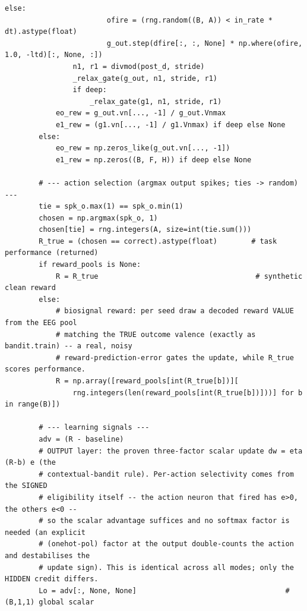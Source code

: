\begin{lstlisting}[caption={mrl\_trace/deep.py},label={lst:siox-src-deep}]
                    else:
                        ofire = (rng.random((B, A)) < in_rate * dt).astype(float)
                        g_out.step(dfire[:, :, None] * np.where(ofire, 1.0, -ltd)[:, None, :])
                n1, r1 = divmod(post_d, stride)
                _relax_gate(g_out, n1, stride, r1)
                if deep:
                    _relax_gate(g1, n1, stride, r1)
            eo_rew = g_out.vn[..., -1] / g_out.Vnmax
            e1_rew = (g1.vn[..., -1] / g1.Vnmax) if deep else None
        else:
            eo_rew = np.zeros_like(g_out.vn[..., -1])
            e1_rew = np.zeros((B, F, H)) if deep else None

        # --- action selection (argmax output spikes; ties -> random) ---
        tie = spk_o.max(1) == spk_o.min(1)
        chosen = np.argmax(spk_o, 1)
        chosen[tie] = rng.integers(A, size=int(tie.sum()))
        R_true = (chosen == correct).astype(float)        # task performance (returned)
        if reward_pools is None:
            R = R_true                                     # synthetic clean reward
        else:
            # biosignal reward: per seed draw a decoded reward VALUE from the EEG pool
            # matching the TRUE outcome valence (exactly as bandit.train) -- a real, noisy
            # reward-prediction-error gates the update, while R_true scores performance.
            R = np.array([reward_pools[int(R_true[b])][
                rng.integers(len(reward_pools[int(R_true[b])]))] for b in range(B)])

        # --- learning signals ---
        adv = (R - baseline)
        # OUTPUT layer: the proven three-factor scalar update dw = eta (R-b) e (the
        # contextual-bandit rule). Per-action selectivity comes from the SIGNED
        # eligibility itself -- the action neuron that fired has e>0, the others e<0 --
        # so the scalar advantage suffices and no softmax factor is needed (an explicit
        # (onehot-pol) factor at the output double-counts the action and destabilises the
        # update sign). This is identical across all modes; only the HIDDEN credit differs.
        Lo = adv[:, None, None]                                   # (B,1,1) global scalar


\end{lstlisting}
